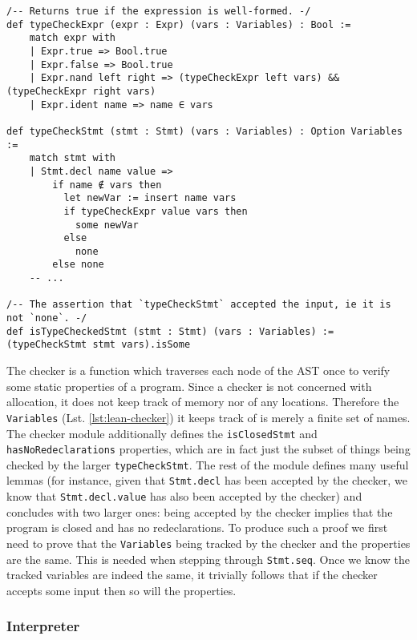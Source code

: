 \begin{lstlisting}[language=lean,caption={The checker for a FormalLang program. \texttt{typeCheckStmt} shortened to only show handling of declarations.},label={lst:lean-checker},frame=none,escapechar=*,basicstyle=\tt\scriptsize]
/-- Returns true if the expression is well-formed. -/
def typeCheckExpr (expr : Expr) (vars : Variables) : Bool :=
    match expr with
    | Expr.true => Bool.true
    | Expr.false => Bool.true
    | Expr.nand left right => (typeCheckExpr left vars) && (typeCheckExpr right vars)
    | Expr.ident name => name ∈ vars

def typeCheckStmt (stmt : Stmt) (vars : Variables) : Option Variables :=
    match stmt with
    | Stmt.decl name value =>
        if name ∉ vars then
          let newVar := insert name vars
          if typeCheckExpr value vars then
            some newVar
          else
            none
        else none
    -- ...

/-- The assertion that `typeCheckStmt` accepted the input, ie it is not `none`. -/
def isTypeCheckedStmt (stmt : Stmt) (vars : Variables) := (typeCheckStmt stmt vars).isSome
\end{lstlisting}

The checker is a function which traverses each node of the AST once to verify some static properties of a program. Since a checker is not concerned with allocation, it does not keep track of memory nor of any locations. Therefore the \texttt{Variables} (Lst. \ref{lst:lean-checker}) it keeps track of is merely a finite set of names. The checker module additionally defines the \texttt{isClosedStmt} and \texttt{hasNoRedeclarations} properties, which are in fact just the subset of things being checked by the larger \texttt{typeCheckStmt}. The rest of the module defines many useful lemmas (for instance, given that \texttt{Stmt.decl} has been accepted by the checker, we know that \texttt{Stmt.decl.value} has also been accepted by the checker) and concludes with two larger ones: being accepted by the checker implies that the program is closed and has no redeclarations. To produce such a proof we first need to prove that the \texttt{Variables} being tracked by the checker and the properties are the same. This is needed when stepping through \texttt{Stmt.seq}. Once we know the tracked variables are indeed the same, it trivially follows that if the checker accepts some input then so will the properties.

\subsubsection{Interpreter}

